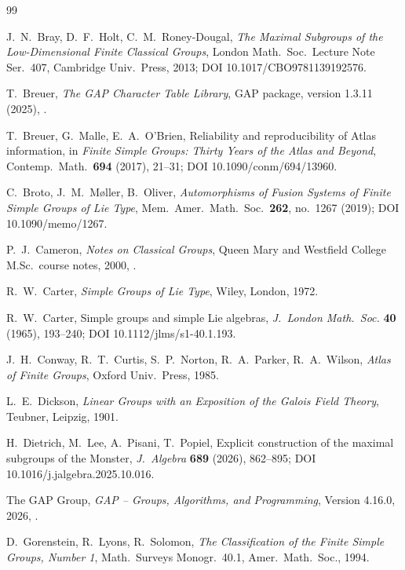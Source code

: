 \documentclass[11pt]{amsart}
\theoremstyle{definition}
\theoremstyle{remark}
\begin{document}
\begin{thebibliography}{99}

J.~N.~Bray, D.~F.~Holt, C.~M.~Roney-Dougal,
\emph{The Maximal Subgroups of the Low-Dimensional Finite Classical
Groups}, London Math.\ Soc.\ Lecture Note Ser.\ 407, Cambridge Univ.\
Press, 2013; DOI 10.1017/CBO9781139192576.

T.~Breuer, \emph{The GAP Character Table Library}, GAP package,
version 1.3.11 (2025),
.

T.~Breuer, G.~Malle, E.~A.~O'Brien, Reliability and reproducibility of
Atlas information, in \emph{Finite Simple Groups: Thirty Years of the
Atlas and Beyond}, Contemp.\ Math.\ \textbf{694} (2017), 21--31;
DOI 10.1090/conm/694/13960.

C.~Broto, J.~M.~M\o ller, B.~Oliver, \emph{Automorphisms of Fusion
Systems of Finite Simple Groups of Lie Type}, Mem.\ Amer.\ Math.\ Soc.\
\textbf{262}, no.~1267 (2019); DOI 10.1090/memo/1267.

P.~J.~Cameron, \emph{Notes on Classical Groups}, Queen Mary and
Westfield College M.Sc.\ course notes, 2000,
.

\bibitem{Carter}
R.~W.~Carter, \emph{Simple Groups of Lie Type}, Wiley, London, 1972.

\bibitem{Carter1965}
R.~W.~Carter, Simple groups and simple Lie algebras,
\emph{J.\ London Math.\ Soc.} \textbf{40} (1965), 193--240;
DOI 10.1112/jlms/s1-40.1.193.

J.~H.~Conway, R.~T.~Curtis, S.~P.~Norton, R.~A.~Parker, R.~A.~Wilson,
\emph{Atlas of Finite Groups}, Oxford Univ.\ Press, 1985.

L.~E.~Dickson, \emph{Linear Groups with an Exposition of the Galois
Field Theory}, Teubner, Leipzig, 1901.

H.~Dietrich, M.~Lee, A.~Pisani, T.~Popiel, Explicit construction of the
maximal subgroups of the Monster, \emph{J.\ Algebra} \textbf{689} (2026),
862--895; DOI 10.1016/j.jalgebra.2025.10.016.

The GAP Group, \emph{GAP -- Groups, Algorithms, and Programming},
Version 4.16.0, 2026, .

D.~Gorenstein, R.~Lyons, R.~Solomon, \emph{The Classification of the
Finite Simple Groups, Number 1}, Math.\ Surveys Monogr.\ 40.1, Amer.\
Math.\ Soc., 1994.


\end{thebibliography}
\end{document}
